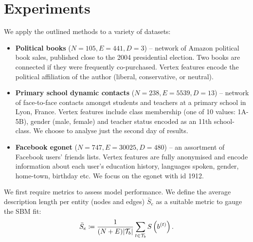 \section{Experiments}
\label{sec:experiments}

We apply the outlined methods to a variety of datasets:

\begin{itemize}
	\item \textbf{Political books} \cite{polbooks} ($N=105, E=441, D=3$) -- network of Amazon political book sales, published close to the 2004 presidential election. Two books are connected if they were frequently co-purchased. Vertex features encode the political affiliation of the author (liberal, conservative, or neutral).
	\item \textbf{Primary school dynamic contacts} \cite{schools} ($N=238, E=5539, D=13$) -- network of face-to-face contacts amongst students and teachers at a primary school in Lyon, France. Vertex features include class membership (one of 10 values: 1A-5B), gender (male, female) and teacher status encoded as an 11th school-class. We choose to analyse just the second day of results.
	\item \textbf{Facebook egonet} \cite{fb-snap} ($N=747, E=30025, D=480$) -- an assortment of Facebook users' friends lists. Vertex features are fully anonymised and encode information about each user's education history, languages spoken, gender, home-town, birthday etc. We focus on the egonet with id 1912.
\end{itemize}
%
We first require metrics to assess model performance. We define the average
description length per entity (nodes and edges) $\bar{S}_e$ as a suitable metric to gauge the SBM fit:
%
\begin{equation}
	\bar{S}_e \coloneqq \frac{1}{(N+E) |\mathcal{T}_b|} \sum_{t\in \mathcal{T}_b} S \left( b^{(t)} \right).
	\label{eqn:mean-dl}
\end{equation}

